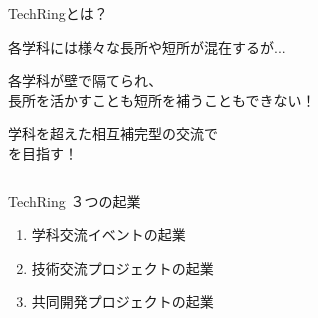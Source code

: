 \documentclass[dvipdfmx]{beamer}
\begin{document}
\begin{frame}{TechRingとは？}

  \begin{description}[一つの輪に]
    \item[学科の壁] 各学科には様々な長所や短所が混在するが...\par
    各学科が壁で隔てられ、\\長所を活かすことも短所を補うこともできない！\par
    \hspace{0.3\textwidth}
    \vspace{-1.5mm}
    \item[一つの輪に] 学科を超えた相互補完型の交流で\\を目指す！
  \end{description}

  \begin{columns}
    \begin{column}{0.55\textwidth}
      \begin{center}
        \begin{block}{TechRing ３つの起業}
          \vspace{2mm}
          \begin{enumerate}
            \setlength{\itemsep}{3mm}
            \item 学科交流イベントの起業
            \item 技術交流プロジェクトの起業
            \item 共同開発プロジェクトの起業
          \end{enumerate}
        \end{block}
      \end{center}
    \end{column}


\end{columns}
\end{frame}
\end{document}
